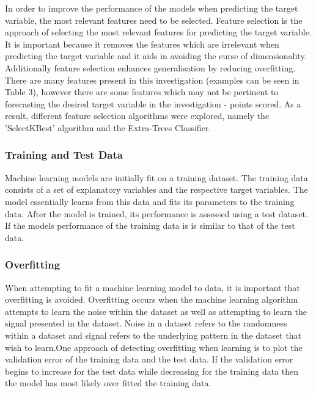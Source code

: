 \documentclass[a4paper,11pt,twoside]{article}
\begin{document}
In order to improve the performance of the models when predicting the target variable, the most relevant features need to be selected. Feature selection is the approach of selecting the most relevant features for predicting the target variable. It is important because it removes the features which are irrelevant when predicting the target variable and it aids in avoiding the curse of dimensionality. Additionally feature selection enhances generalisation by reducing overfitting. There are many features present in this investigation (examples can be seen in Table 3), however there are some features which may not be pertinent to forecasting the desired target variable in the investigation - points scored. As a result, different feature selection algorithms were explored, namely the 'SelectKBest' algorithm and the Extra-Trees Classifier.

 \subsubsection{Training and Test Data}
Machine learning models are initially fit on a training dataset. The training data consists of a set of explanatory variables and the respective target variables. The model essentially learns from this data and fits its parameters to the training data. After the model is trained, its performance is assessed using a test dataset. If the models performance of the training data is is similar to that of the test data.

\subsubsection{Overfitting}
When attempting to fit a machine learning model to data, it is important that overfitting is avoided. Overfitting occurs when the machine learning algorithm attempts to learn the noise within the dataset as well as attempting to learn the signal presented in the dataset. Noise in a dataset refers to the randomness within a dataset and signal refers to the underlying pattern in the dataset that wish to learn.One approach of detecting overfitting when learning is to plot the validation error of the training data and the test data. If the validation error begins to increase for the test data while decreasing for the training data then the model has most likely over fitted the training data. 
\end{document}
